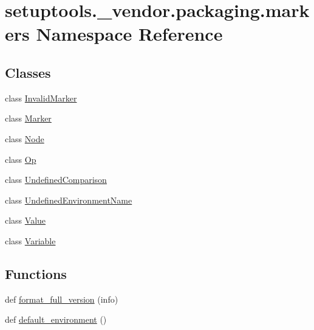 \hypertarget{namespacesetuptools_1_1__vendor_1_1packaging_1_1markers}{}\section{setuptools.\+\_\+vendor.\+packaging.\+markers Namespace Reference}
\label{namespacesetuptools_1_1__vendor_1_1packaging_1_1markers}
\subsection*{Classes}
\begin{DoxyCompactItemize}
\item 
class \hyperlink{classsetuptools_1_1__vendor_1_1packaging_1_1markers_1_1_invalid_marker}{Invalid\+Marker}
\item 
class \hyperlink{classsetuptools_1_1__vendor_1_1packaging_1_1markers_1_1_marker}{Marker}
\item 
class \hyperlink{classsetuptools_1_1__vendor_1_1packaging_1_1markers_1_1_node}{Node}
\item 
class \hyperlink{classsetuptools_1_1__vendor_1_1packaging_1_1markers_1_1_op}{Op}
\item 
class \hyperlink{classsetuptools_1_1__vendor_1_1packaging_1_1markers_1_1_undefined_comparison}{Undefined\+Comparison}
\item 
class \hyperlink{classsetuptools_1_1__vendor_1_1packaging_1_1markers_1_1_undefined_environment_name}{Undefined\+Environment\+Name}
\item 
class \hyperlink{classsetuptools_1_1__vendor_1_1packaging_1_1markers_1_1_value}{Value}
\item 
class \hyperlink{classsetuptools_1_1__vendor_1_1packaging_1_1markers_1_1_variable}{Variable}
\end{DoxyCompactItemize}
\subsection*{Functions}
\begin{DoxyCompactItemize}
\item 
def \hyperlink{namespacesetuptools_1_1__vendor_1_1packaging_1_1markers_ae9c8124133d5c113bfe9a21fb6b9cd04}{format\+\_\+full\+\_\+version} (info)
\item 
def \hyperlink{namespacesetuptools_1_1__vendor_1_1packaging_1_1markers_a9fa619979508af28a6c53b0b61c3ae15}{default\+\_\+environment} ()
\end{DoxyCompactItemize}
